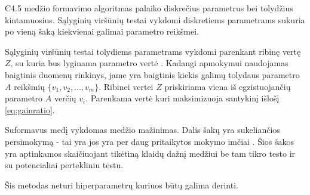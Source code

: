 C4.5 medžio formavimo algoritmas palaiko diskrečius parametrus bei tolydžius kintamuosius.
Sąlyginių viršūnių testai vykdomi diskretiems parametrams sukuria po vieną šaką kiekvienai galimai parametro reikšmei.

Sąlyginių viršūnių testai tolydiems parametrams vykdomi parenkant ribinę vertę $Z$, su kuria bus lyginama parametro
 vertė \cite{c45}. Kadangi apmokymui naudojamas baigtinis duomenų rinkinys, jame yra baigtinis
kiekis galimų tolydaus parametro $A$ reikšmių $\{v_1, v_2, ..., v_m\}$. Ribinei vertei $Z$ priskiriama
viena iš egzistuojančių parametro $A$ verčių  $v_i$. Parenkama vertė kuri maksimizuoja
santykinį išlošį \ref{eq:gainratio}.

Suformavus medį vykdomas medžio mažinimas. Dalis šakų yra sukeliančios persimokymą - tai yra
jos yra per daug pritaikytos mokymo imčiai \cite{c45}. Šios šakos yra aptinkamos skaičiuojant
tikėtiną klaidų dažnį medžiui be tam tikro testo ir su potencialiai pertekliniu testu.

Šis metodas neturi hiperparametrų kuriuos būtų galima derinti.